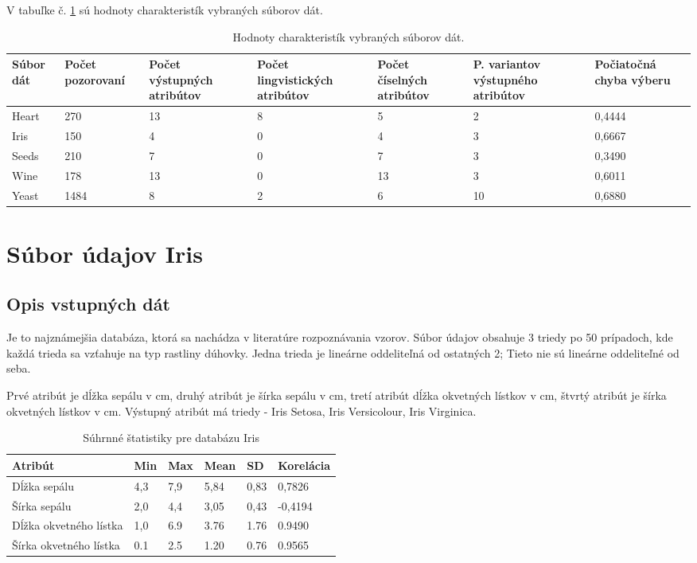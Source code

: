 V tabuľke č. \ref{table:suborydat} sú hodnoty charakteristík vybraných súborov dát.


\begin{table}[h!]
	\centering
\begin{tabular}{|p{}|p{2cm}|p{2cm}|p{}|p{2cm}|p{}|p{2cm}|}
	\hline 
	
	Súbor dát & Počet  \mbox{pozorovaní} & Počet \mbox{výstupných} atribútov&
   Počet \mbox{lingvistických} atribútov&
    Počet \mbox{číselných} atribútov& 	
	P. variantov výstupného atribútov  & \mbox{Počiatočná} chyba výberu \\ 
	\hline 
	
	Heart & 270 & 13 &8& 5 & 2 & 0,4444 \\ 
	\hline 
	Iris & 150 & 4 &0 &4& 3 & 0,6667 \\ 
	\hline 
	Seeds & 210 & 7&0 & 7 & 3 & 0,3490 \\ 
	\hline 
	Wine & 178 & 13&0&13& 3 & 0,6011 \\ 
	\hline 
	Yeast & 1484 & 8 &2& 6 & 10 & 0,6880 \\ 
	\hline 	
\end{tabular} 
	\caption{Hodnoty charakteristík vybraných súborov dát.}
\label{table:suborydat}
\end{table}


\section{Súbor údajov Iris}

\subsection{Opis vstupných dát}
Je to najznámejšia databáza, ktorá sa nachádza v literatúre rozpoznávania vzorov. Súbor údajov obsahuje 3 triedy po 50 prípadoch, kde každá trieda sa vzťahuje na typ rastliny dúhovky. Jedna trieda je lineárne oddeliteľná od ostatných 2; Tieto nie sú lineárne oddeliteľné od seba. 

Prvé atribút je dĺžka sepálu v cm, druhý atribút je šírka sepálu v cm, tretí atribút dĺžka okvetných lístkov v cm, štvrtý atribút je šírka okvetných lístkov v cm. Výstupný atribút má triedy - Iris Setosa, Iris Versicolour, Iris Virginica. 

\begin{table}[h!]
\centering

\label{suhrne-statistiky-iris}
\begin{tabular}{|l|l|l|l|l|l|}
\hline
\textbf{Atribút} & \textbf{Min} & \textbf{Max} & \textbf{Mean} & \textbf{SD} & \textbf{Korelácia} \\ \hline
Dĺžka sepálu & 4,3 & 7,9 & 5,84 & 0,83 & 0,7826 \\ \hline
Šírka sepálu & 2,0 & 4,4 & 3,05 & 0,43 & -0,4194 \\ \hline
Dĺžka okvetného lístka & 1,0 & 6.9 & 3.76 & 1.76 & 0.9490 \\ \hline
Šírka okvetného lístka & 0.1 & 2.5 & 1.20 & 0.76 & 0.9565 \\ \hline
\end{tabular}
\caption{Súhrnné štatistiky pre databázu Iris}
\end{table}
